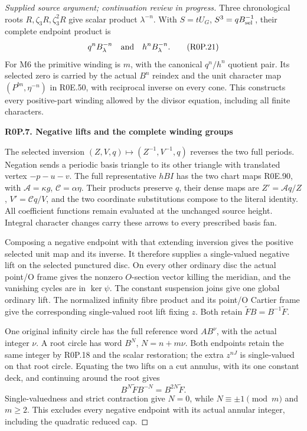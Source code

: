 \begin{proof}[Supplied source argument; continuation review in progress]
Three chronological roots \(R,\zeta_3R,\zeta_3^2R\)
give scalar product \(\lambda^{-n}\). With
\(S=tU_G\), \(S^3=qB_{\rm sel}^{-1}\), their
complete endpoint product is
\[
 q^nB_\lambda^{-n}\quad\hbox{and}\quad
 h^nB_\lambda^{-n}.
 \tag{R0P.21}
\]
For M6 the primitive winding is \(m\), with the
canonical \(q^n/h^n\) quotient pair. Its selected
zero is carried by the actual \(B^n\) reindex and
the unit character map \((P^{bn},\eta^{-n})\) in
R0E.50, with reciprocal inverse on every cone.
This constructs every positive-part winding allowed
by the divisor equation, including all finite characters.

\par

\medskip\noindent\textbf{R0P.7. Negative lifts and the complete winding groups}

\par\nobreak

The selected inversion \((Z,V,q)\mapsto(Z^{-1},V^{-1},q)\)
reverses the two full periods. Negation sends a periodic
basis triangle to its other triangle with translated
vertex \(-p-u-v\). The full representative \(hBI\)
has the two chart maps R0E.90, with
\(\mathcal A=\kappa g\), \(\mathcal C=\alpha\eta\).
Their products preserve \(q\), their dense maps are
\(Z'=\mathcal A q/Z\), \(V'=\mathcal C q/V\), and
the two coordinate substitutions compose to the literal
identity. All coefficient functions remain evaluated at
the unchanged source height. Integral character changes
carry these arrows to every prescribed basis fan.

Composing a negative endpoint with that extending
inversion gives the positive selected unit map and
its inverse. It therefore supplies a single-valued
negative lift on the selected punctured disc.
On every other ordinary disc the actual point/O
frame gives the nonzero \(O\)-section vector killing
the meridian, and the vanishing cycles are in
\(\ker\psi\). The constant suspension joins give
one global ordinary lift. The normalized infinity
fibre product and its point/O Cartier frame give
the corresponding single-valued root lift fixing
\(z\). Both retain
\(\widetilde F B=B^{-1}\widetilde F\).

One original infinity circle has the full reference
word \(AB^\nu\), with the actual integer \(\nu\).
A root circle has word \(B^N\),
\(N=n+m\nu\). Both endpoints retain the same
integer by R0P.18 and the scalar restoration; the
extra \(z^{nJ}\) is single-valued on that root
circle. Equating the two lifts on a cut annulus,
with its one constant deck, and continuing around
the root gives
\[
 B^N\widetilde F B^{-N}=B^{2N}\widetilde F.
 \tag{R0P.22}
\]
Single-valuedness and strict contraction give
\(N=0\), while \(N\equiv\pm1\pmod m\) and
\(m\ge2\). This excludes every negative endpoint
with its actual annular integer, including the
quadratic reduced cap.


\end{proof}
